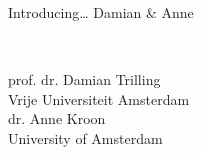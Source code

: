 \documentclass[compress]{beamer}
\begin{document}
\begin{frame}{Introducing\ldots} {\huge{Damian \& Anne}} \small{} 
\begin{columns}[]   \\ prof. dr. Damian Trilling \\ Vrije Universiteit Amsterdam
  \\ dr. Anne Kroon \\ University of Amsterdam
\end{columns}
\end{frame}
\end{document}
